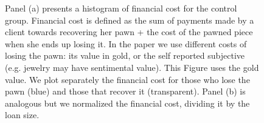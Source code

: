 \documentclass[oneside,11pt]{article}
\begin{document}
\begin{figure}[H]
         \scriptsize
         Panel (a) presents a histogram of financial cost for the control group. Financial cost is defined as the sum of payments made by a client towards recovering her pawn + the cost of the pawned piece when she ends up losing it. In the paper we use different costs of losing the pawn: its value in gold, or the self reported subjective (e.g. jewelry may have sentimental value). This Figure uses the gold value. We plot separately the financial cost for those who lose the pawn (blue) and those that recover it (transparent).  Panel (b) is analogous but we normalized the financial cost, dividing it by the loan size.  %
\end{figure}
\end{document}
